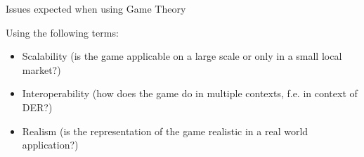 Issues expected when using Game Theory

Using the following terms:
\begin{itemize}
	\item Scalability (is the game applicable on a large scale or only in a small local market?)
	\item Interoperability (how does the game do in multiple contexts, f.e. in context of DER?)
	\item Realism (is the representation of the game realistic in a real world application?)
\end{itemize}